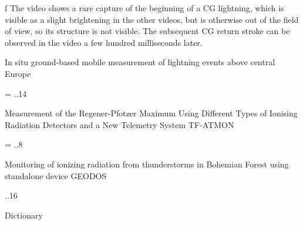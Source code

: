 \midinsert
{}
\caption/f   The video shows a rare capture of the beginning of a CG lightning, which is visible as a slight brightening in the other videos, but is otherwise out of the field of view, so its structure is not visible. The subsequent CG return stroke can be observed in the video a few hundred milliseconds later.
\endinsert

 In situ ground-based mobile measurement of lightning events above central Europe


\vfil\break
\pgstyle
   {\def\headline{}%
    \def\footline{\hss\folio\hss}%
   }
{\picw=\pdfpagewidth
 ..14 }
\pgstyle{} %


 Measurement of the Regener-Pfotzer Maximum Using Different Types of Ionising Radiation Detectors and a New Telemetry System TF-ATMON

\vfil\break
\pgstyle
   {\def\headline{}%
    \def\footline{\hss\folio\hss}%
   }
{\picw=\pdfpagewidth
 ..8 }
\pgstyle{} %



 Monitoring of ionizing radiation from thunderstorms in Bohemian Forest using standalone device GEODOS

\vfil\break
\pgstyle
   {\def\headline{}%
    \def\footline{\hss\folio\hss}%
   }
{\pdfpagewidth
 ..16 }
\pgstyle{} %



\app Dictionary
\makeglos

\bye
